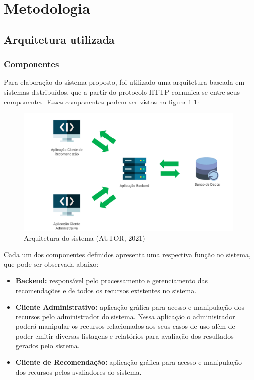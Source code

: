 

\setlength{\afterchapskip}{1.5cm minus \baselineskip}


\chapter{Metodologia}
\label{cha:metodologia}

\section{Arquitetura utilizada}

\subsection{Componentes}

Para elaboração do sistema proposto, foi utilizado uma arquitetura baseada em sistemas distribuídos, que a partir do protocolo HTTP comunica-se entre seus componentes. Esses componentes podem ser vistos na figura \ref{fig:arquitetura}:

\begin{figure}[H]
	\centering
	\includegraphics[width=0.7\linewidth]{imagens/arquitetura.png}
	\caption[Arquitetura do sistema]{Arquitetura do sistema (AUTOR, 2021)}
    \label{fig:arquitetura}
\end{figure}

Cada um dos componentes definidos apresenta uma respectiva função no sistema, que pode ser observada abaixo:

\begin{itemize}
    \item \textbf{Backend:} responsável pelo processamento e gerenciamento das recomendações e de todos os recursos existentes no sistema.
    
    \item \textbf{Cliente Administrativo:} aplicação gráfica para acesso e manipulação dos recursos pelo administrador do sistema. Nessa aplicação o administrador poderá manipular os recursos relacionados aos seus casos de uso além de poder emitir diversas listagens e relatórios para avaliação dos resultados gerados pelo sistema.
    
    \item \textbf{Cliente de Recomendação:} aplicação gráfica para acesso e manipulação dos recursos pelos avaliadores do sistema.
\end{itemize}


